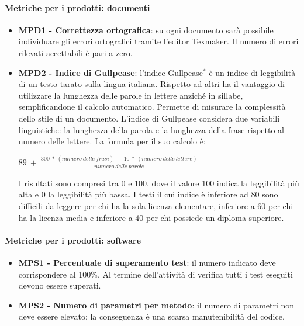 \documentclass[11pt,a4paper]{article}
\begin{document}
{\begin{itemize}
	\end{itemize}
	
	
	\paragraph{Metriche per i prodotti: documenti} 
	\begin{itemize}
		\item \textbf{MPD1 - Correttezza ortografica}: su ogni documento sarà possibile individuare gli errori ortografici tramite l'editor Texmaker. Il numero di errori rilevati accettabili è pari a zero.
	
		\item \textbf{MPD2 - Indice di Gullpease}: l'indice Gullpease$^*$ è un indice di leggibilità di un testo tarato sulla lingua italiana. Rispetto ad altri ha il vantaggio di utilizzare la lunghezza delle parole in lettere anziché in sillabe, semplificandone il calcolo automatico. Permette di misurare la complessità dello stile di un documento. L'indice di Gullpease considera due variabili linguistiche: la lunghezza della parola e la lunghezza della frase rispetto al numero delle lettere. La formula per il suo calcolo è:
	\begin{center}
		$89\ +\ \frac{300\ *\ (numero\ delle\ frasi)\ -\ 10\ *\ (numero\ delle\ lettere)}{numero\ delle\ parole}$
	\end{center}
	I risultati sono compresi tra 0 e 100, dove il valore 100 indica la leggibilità più alta e 0 la leggibilità più bassa. I testi il cui indice è inferiore ad 80 sono difficili da leggere per chi ha la sola licenza elementare, inferiore a 60 per chi ha la licenza media e inferiore a 40 per chi possiede un diploma superiore.
	
	\end{itemize}
	
	\paragraph{Metriche per i prodotti: software} 
	\begin{itemize}
		\item \textbf{MPS1 - Percentuale di superamento test}: il numero indicato deve corrispondere al 100\%. Al termine dell'attività di verifica tutti i test eseguiti devono essere superati.
		
	    \item \textbf{MPS2 - Numero di parametri per metodo}: il numero di parametri non deve essere elevato; la conseguenza è una scarsa manutenibilità del codice.
	

\end{itemize}}
\end{document}

